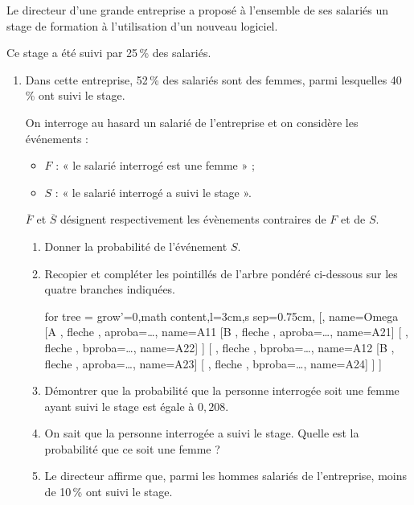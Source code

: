 Le directeur d’une grande entreprise a proposé à l’ensemble de ses salariés un stage de formation à l’utilisation d’un nouveau logiciel.

\smallskip

Ce stage a été suivi par 25\,\% des salariés.

\begin{enumerate}
	\item Dans cette entreprise, 52\,\% des salariés sont des femmes, parmi lesquelles 40\,\% ont suivi le stage.
	
	On interroge au hasard un salarié de l’entreprise et on considère les événements :
	
	\begin{itemize}
		\item $F$ : « le salarié interrogé est une femme » ;
		\item $S$ : « le salarié interrogé a suivi le stage ».
	\end{itemize}
	
	$\overline{F}$ et $\overline{S}$ désignent respectivement les évènements contraires de $F$ et de $S$.
	\begin{enumerate}
		\item Donner la probabilité de l’événement $S$.
		\item Recopier et compléter les pointillés de l’arbre pondéré ci-dessous sur
		les quatre branches indiquées.
		
		\begin{center}
			\begin{forest} for tree = {grow'=0,math content,l=3cm,s sep=0.75cm},
				[\Omega , name=Omega
					[A , fleche , aproba=\ldots , name=A11
						[B , fleche , aproba=\ldots , name=A21]
						[ , fleche , bproba=\ldots , name=A22]
					]
					[ , fleche , bproba=\ldots , name=A12
						[B , fleche , aproba=\ldots , name=A23]
						[ , fleche , bproba=\ldots , name=A24]
					]
				]
			\end{forest}
		\end{center}
		\item Démontrer que la probabilité que la personne interrogée soit une femme ayant suivi le stage est égale à $0,208$.
		\item On sait que la personne interrogée a suivi le stage. Quelle est la probabilité que ce soit une femme ?
		\item Le directeur affirme que, parmi les hommes salariés de l’entreprise, moins de 10\,\% ont suivi le stage.
		

\end{enumerate}
\end{enumerate}
